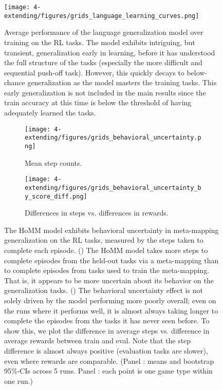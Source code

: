 \begin{figure}[htb]
\centering
\texttt{[image: 4-extending/figures/grids\_language\_learning\_curves.png]}
\caption[Language generalization model learning curves on the RL tasks.]{Average performance of the language generalization model over training on the RL tasks. The model exhibits intriguing, but transient, generalization early in learning, before it has understood the full structure of the tasks (especially the more difficult and sequential push-off task). However, this quickly decays to below-chance generalization as the model masters the training tasks. This early generalization is not included in the main results since the train accuracy at this time is below the threshold of having adequately learned the tasks.} \label{fig:HoMM_RL_language_learning_curves}
\end{figure}

\begin{figure}[htb]
\centering
\begin{subfigure}{0.5\textwidth}
\centering
\texttt{[image: 4-extending/figures/grids\_behavioral\_uncertainty.png]}
\caption{Mean step counts.}\label{fig:extending:RL:behavioral_uncertainty:main}
\end{subfigure}%
\begin{subfigure}{0.5\textwidth}
\centering
\texttt{[image: 4-extending/figures/grids\_behavioral\_uncertainty\_by\_score\_diff.png]}
\caption{Differences in steps vs. differences in rewards.}\label{fig:extending:RL:behavioral_uncertainty:deltas}
\end{subfigure}
\caption[The HoMM model exhibits behavioral uncertainty in meta-mapping generalization on the RL tasks.]{The HoMM model exhibits behavioral uncertainty in meta-mapping generalization on the RL tasks, measured by the steps taken to complete each episode. () The HoMM model takes more steps to complete episodes from the held-out tasks via a meta-mapping than to complete episodes from tasks used to train the meta-mapping. That is, it appears to be more uncertain about its behavior on the generalization tasks. () The behavioral uncertainty effect is not solely driven by the model performing more poorly overall; even on the runs where it performs well, it is almost always taking longer to complete the episodes from the tasks it has never seen before. To show this, we plot the difference in average steps vs. difference in average rewards between train and eval. Note that the step difference is almost always positive (evaluation tasks are slower), even where rewards are comparable. (Panel : means and bootstrap 95\%-CIs across 5 runs. Panel : each point is one game type within one run.)} \label{fig:extending:RL:behavioral_uncertainty}
\end{figure}


